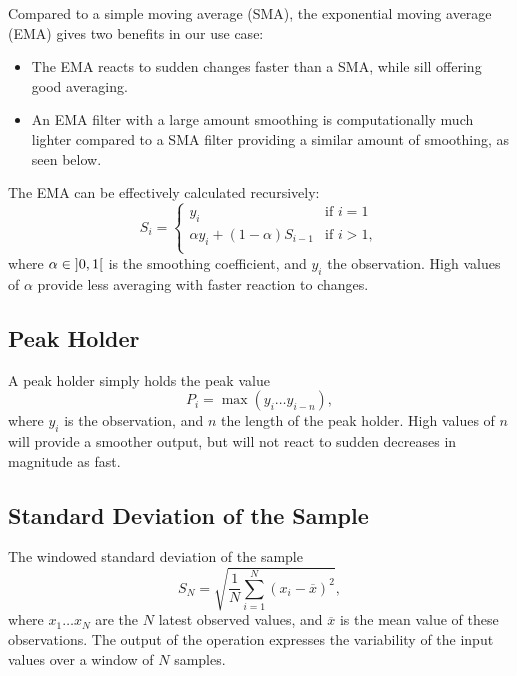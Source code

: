 Compared to a simple moving average (SMA),
the exponential moving average (EMA)
gives two benefits in our use case:
\begin{itemize}
\item The EMA reacts to sudden changes faster than a SMA,
while sill offering good averaging.
\item An EMA filter with a large amount smoothing is computationally much
lighter compared to a SMA filter providing a similar amount of smoothing,
as seen below.
\end{itemize}
The EMA can be effectively calculated recursively:
\begin{equation}
S_i =
\begin{cases}
y_i & \text{if } i = 1 \\
\alpha y_i + ( 1 - \alpha ) S_{i-1} & \text{if } i > 1, \\
\end{cases}
\end{equation}
where $\alpha \in \mathopen] 0, 1 \mathclose[$ is the smoothing coefficient,
and $y_i$ the \nth[i] observation.
High values of $\alpha$
provide less averaging with faster reaction to changes.

\subsection{Peak Holder}

A peak holder simply holds the peak value
\begin{equation}
P_i = \max \left( y_i \ldots y_{i - n} \right),
\end{equation}
where $y_i$ is the \nth[i] observation,
and $n$ the length of the peak holder.
High values of $n$ will provide a smoother output,
but will not react to sudden decreases in magnitude as fast.

\subsection{Standard Deviation of the Sample}

The windowed standard deviation of the sample
\begin{equation}
S_N = \sqrt{\frac{1}{N} \sum_{i=1}^N (x_i - \overline{x})^2 },
\end{equation}
where $x_1 \ldots x_N$ are the $N$ latest observed values,
and $\overline{x}$ is the mean value of these observations.
The output of the operation expresses the
variability of the input values over a window of $N$ samples.

